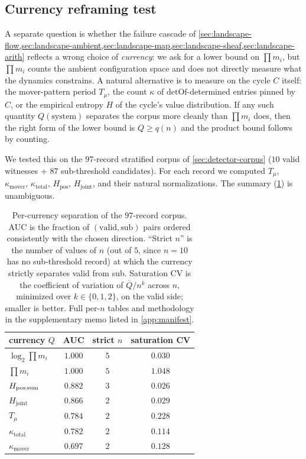 \documentclass[11pt,a4paper]{article}
\theoremstyle{plain}
\theoremstyle{definition}
\newcommand{\detOf}{\mathrm{detOf}}
\begin{document}
\subsection{Currency reframing test}\label{sec:landscape-currency}

A separate question is whether the failure cascade of
\cref{sec:landscape-flow,sec:landscape-ambient,sec:landscape-map,sec:landscape-sheaf,sec:landscape-arith}
reflects a wrong choice of \emph{currency}: we ask for a lower
bound on $\prod m_i$, but $\prod m_i$ counts the ambient
configuration space and does not directly measure what the
dynamics constrains.  A natural alternative is to measure on the
cycle $C$ itself: the mover-pattern period $T_\mu$, the count
$\kappa$ of $\detOf$-determined entries pinned by $C$, or the
empirical entropy $H$ of the cycle's value distribution.  If any
such quantity $Q(\text{system})$ separates the corpus more cleanly
than $\prod m_i$ does, then the right form of the lower bound is
$Q \ge q(n)$ and the product bound follows by counting.

We tested this on the $97$-record stratified corpus of
\cref{sec:detector-corpus} ($10$ valid witnesses + $87$
sub-threshold candidates).  For each record we computed $T_\mu$,
$\kappa_{\text{mover}}$, $\kappa_{\text{total}}$,
$H_{\text{pos}}$, $H_{\text{joint}}$, and their natural
normalizations.  The summary (\cref{tab:currency-reframe}) is
unambiguous.

\begin{table}[ht]
\centering
\caption{Per-currency separation of the $97$-record corpus.  AUC is the
fraction of $(\text{valid}, \text{sub})$ pairs ordered consistently with
the chosen direction.  ``Strict $n$'' is the number of values of $n$
(out of $5$, since $n = 10$ has no sub-threshold record) at which the
currency strictly separates valid from sub.  Saturation CV is the
coefficient of variation of $\overline{Q}/n^k$ across $n$, minimized
over $k \in \{0, 1, 2\}$, on the valid side; smaller is better.
Full per-$n$ tables and methodology in the supplementary memo
listed in \cref{app:manifest}.}\label{tab:currency-reframe}
\begin{tabular}{l c c c}
\toprule
currency $Q$ & AUC & strict $n$ & saturation CV \\\midrule
$\log_2 \prod m_i$ & $1.000$ & $5$ & $0.030$ \\
$\prod m_i$ & $1.000$ & $5$ & $1.048$ \\
$H_{\text{pos\,sum}}$ & $0.882$ & $3$ & $0.026$ \\
$H_{\text{joint}}$ & $0.866$ & $2$ & $0.029$ \\
$T_\mu$ & $0.784$ & $2$ & $0.228$ \\
$\kappa_{\text{total}}$ & $0.782$ & $2$ & $0.114$ \\
$\kappa_{\text{mover}}$ & $0.697$ & $2$ & $0.128$ \\
\bottomrule
\end{tabular}
\end{table}
\end{document}
